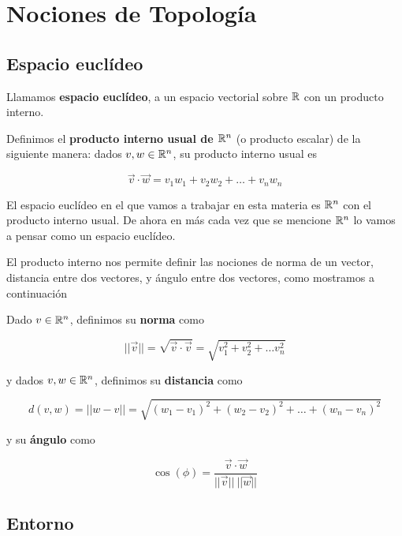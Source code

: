 
\chapter{Nociones de Topología}

\section{Espacio euclídeo}

\begin{definition} \label{espacio euclideo}
Llamamos \textbf{espacio euclídeo},  a un espacio vectorial sobre $\mathbb{R}$ con un producto interno. 
\end{definition}

\begin{definition} \label{producto escalar}
Definimos el \textbf{producto interno usual de $\mathbb{R}^n$} (o producto escalar)  de la siguiente manera: dados $v,w \in \mathbb{R}^n$, su producto interno usual es

$$ \vec{v} \cdot \vec{w} = v_1w_1 + v_2w_2 + \ldots + v_nw_n $$
\end{definition}

El espacio euclídeo en el que vamos a trabajar en esta materia es $ \mathbb{R}^n$ con el producto interno usual.  De ahora en más cada vez que se mencione $\mathbb{R}^n$ lo vamos a pensar como un espacio euclídeo.

El producto interno nos permite definir las nociones de norma de un vector, distancia entre dos vectores, y ángulo entre dos vectores, como mostramos a continuación

\begin{definition}[Norma]
Dado $v \in \mathbb{R}^n$, definimos su \textbf{norma} como

$$ ||\vec{v}|| = \sqrt{\vec{v} \cdot \vec{v}} = \sqrt{v_1^2 + v_2^2 + \ldots v_n^2} $$

y dados $v,w \in \mathbb{R}^n$, definimos su \textbf{distancia} como

$$ d(v, w) = ||w-v|| = \sqrt{ (w_1 - v_1)^2 + (w_2 - v_2)^2 + \ldots + (w_n - v_n)^2 } $$

y su \textbf{ángulo} como

$$ \cos(\phi) = \frac{\vec{v} \cdot \vec{w}}{||\vec{v}|| \ || \vec{w}||} $$
\end{definition}


\section{Entorno}

